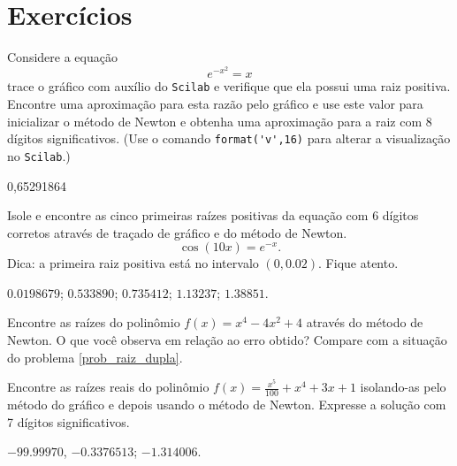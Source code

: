 \section*{Exercícios}

\ifisscilab
\begin{Exercise}\label{new1} Considere a equação
  $$e^{-x^2}=x$$
trace o gráfico com auxílio do \verb+Scilab+ e verifique que ela possui uma raiz positiva. Encontre uma aproximação para esta razão pelo gráfico e use este valor para inicializar o método de Newton e obtenha uma aproximação para a raiz com 8 dígitos significativos. (Use o comando \verb+format('v',16)+ para alterar a visualização no \verb+Scilab+.)
\end{Exercise}
\begin{Answer}
  \begin{tiny}
0,65291864    
  \end{tiny}
\end{Answer}
\fi

\begin{Exercise}\label{new2} Isole e encontre as cinco primeiras raízes positivas da equação com 6 dígitos corretos através de traçado de gráfico e do método de Newton.
$$\cos(10x)=e^{-x}.$$ Dica: a primeira raiz positiva está no intervalo $(0,0.02)$. Fique atento.
\end{Exercise}
\begin{Answer}
  \begin{tiny}
 $0.0198679$; $0.533890$; $0.735412$; $1.13237$; $1.38851$.
  \end{tiny}
\end{Answer}


\begin{Exercise}\label{new3} Encontre as raízes do polinômio $f(x)=x^4-4x^2+4$ através do método de Newton. O que você observa em relação ao erro obtido? Compare com a situação do problema \ref{prob_raiz_dupla}.
\end{Exercise}

\begin{Exercise}\label{new4} Encontre as raízes reais do polinômio $f(x)=\frac{x^5}{100}+x^4+3x+1$ isolando-as pelo método do gráfico e depois usando o método de Newton. Expresse a solução com 7 dígitos significativos.
\end{Exercise}
\begin{Answer}
  \begin{tiny}
$-99.99970$, $-0.3376513$; $-1.314006$.
  \end{tiny}
\end{Answer}

